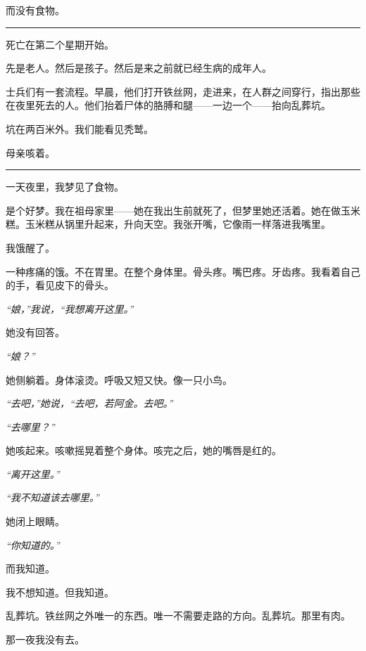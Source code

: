 \noindent 而没有食物。

\vspace{0.5em}\noindent\rule{\textwidth}{0.5pt}\vspace{0.5em}

\noindent 死亡在第二个星期开始。

\noindent 先是老人。然后是孩子。然后是来之前就已经生病的成年人。

\noindent 士兵们有一套流程。早晨，他们打开铁丝网，走进来，在人群之间穿行，指出那些在夜里死去的人。他们抬着尸体的胳膊和腿——一边一个——抬向乱葬坑。

\noindent 坑在两百米外。我们能看见秃鹫。

\noindent 母亲咳着。

\vspace{0.5em}\noindent\rule{\textwidth}{0.5pt}\vspace{0.5em}

\noindent 一天夜里，我梦见了食物。

\noindent 是个好梦。我在祖母家里——她在我出生前就死了，但梦里她还活着。她在做玉米糕。玉米糕从锅里升起来，升向天空。我张开嘴，它像雨一样落进我嘴里。

\noindent 我饿醒了。

\noindent 一种疼痛的饿。不在胃里。在整个身体里。骨头疼。嘴巴疼。牙齿疼。我看着自己的手，看见皮下的骨头。

\noindent \textit{“娘，”我说，“我想离开这里。”}

\noindent 她没有回答。

\noindent \textit{“娘？”}

\noindent 她侧躺着。身体滚烫。呼吸又短又快。像一只小鸟。

\noindent \textit{“去吧，”她说，“去吧，若阿金。去吧。”}

\noindent \textit{“去哪里？”}

\noindent 她咳起来。咳嗽摇晃着整个身体。咳完之后，她的嘴唇是红的。

\noindent \textit{“离开这里。”}

\noindent \textit{“我不知道该去哪里。”}

\noindent 她闭上眼睛。

\noindent \textit{“你知道的。”}

\noindent 而我知道。

\noindent 我不想知道。但我知道。

\noindent 乱葬坑。铁丝网之外唯一的东西。唯一不需要走路的方向。乱葬坑。那里有肉。

\noindent 那一夜我没有去。

